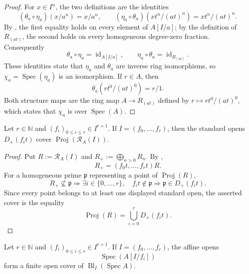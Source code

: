 \begin{proof}
  For $x\in I^n$, the two definitions are the identities
  \[
    (\theta_a\circ\eta_a)(x/a^n)=x/a^n,
    \qquad
    (\eta_a\circ\theta_a)(xt^n/(at)^n)=xt^n/(at)^n.
  \]
  By , the first equality holds on
  every element of $A[I/a]$; by the definition of $R_{(at)}$, the second
  holds on every homogeneous degree-zero fraction.  Consequently
  \[
    \theta_a\circ\eta_a=\operatorname{id}_{A[I/a]},
    \qquad
    \eta_a\circ\theta_a=\operatorname{id}_{R_{(at)}}.
  \]
  These identities state that $\eta_a$ and $\theta_a$ are inverse ring
  isomorphisms, so $\chi_a=\operatorname{Spec}(\eta_a)$ is an isomorphism.
  If $r\in A$, then
  \[
    \theta_a(rt^0/(at)^0)=r/1.
  \]
  Both structure maps are the ring map $A\to R_{(at)}$ defined by
  $r\mapsto rt^0/(at)^0$, which states that $\chi_a$ is over
  $\operatorname{Spec}(A)$.
\end{proof}

\begin{lemma}
  \label{lemma:nagata-rees-generators-cover-proj}

  Let $r\in\mathbb N$ and $(f_i)_{0\leq i\leq r}\in I^{r+1}$.  If
  $I=(f_0,\ldots,f_r)$, then the standard opens
  $D_+(f_it)$ cover $\operatorname{Proj}(\mathcal R_A(I))$.
\end{lemma}

\begin{proof}
  Put $R:=\mathcal R_A(I)$ and
  $R_+:=\bigoplus_{n>0}R_n$.  By
  ,
  \[
    R_+=(f_0t,\ldots,f_rt)R.
  \]
  For a homogeneous prime $\mathfrak p$ representing a point of
  $\operatorname{Proj}(R)$,
  \[
    R_+\nsubseteq\mathfrak p
      \Longrightarrow
      \exists i\in\{0,\ldots,r\},\quad f_it\notin\mathfrak p
      \Longrightarrow
      \mathfrak p\in D_+(f_it).
  \]
  Since every point belongs to at least one displayed standard open, the
  asserted cover is the equality
  \[
    \operatorname{Proj}(R)=\bigcup_{i=0}^rD_+(f_it).
  \]
\end{proof}

\begin{proposition}
  \label{prop:nagata-affine-blowup-chart-cover}

  Let $r\in\mathbb N$ and $(f_i)_{0\leq i\leq r}\in I^{r+1}$.  If
  $I=(f_0,\ldots,f_r)$, the affine opens
  \[
    \operatorname{Spec}(A[I/f_i])
  \]
  form a finite open cover of
  $\operatorname{Bl}_I(\operatorname{Spec}A)$.
\end{proposition}


